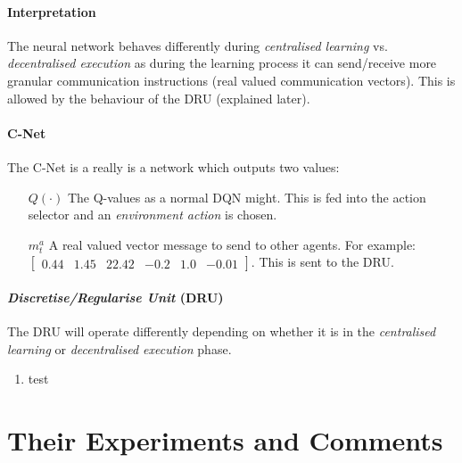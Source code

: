 \documentclass{article}
\begin{document}
    \paragraph{Interpretation} The neural network behaves differently during \emph{centralised learning} vs. \emph{decentralised execution} as during the learning process it can send/receive more granular communication instructions (real valued communication vectors). This is allowed by the behaviour of the DRU (explained later).

    \paragraph{C-Net} The C-Net is a really is a network which outputs two values:
    \begin{enumerate}
        \item[$Q(\cdot)$] The Q-values as a normal DQN might. This is fed into the action selector and an \emph{environment action} is chosen.
        \item[$m^a_t$] A real valued vector message to send to other agents. For example: $\begin{bmatrix} 0.44 & 1.45 & 22.42 & -0.2 & 1.0 & -0.01 \end{bmatrix}$. This is sent to the DRU.
    \end{enumerate}
    \paragraph{\emph{Discretise/Regularise Unit} (DRU)} The DRU will operate differently depending on whether it is in the \emph{centralised learning} or \emph{decentralised execution} phase. 
      
    \begin{enumerate}
        \item test
    \end{enumerate}

    \section{Their Experiments and Comments}
\end{document}
